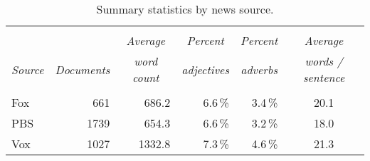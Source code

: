 \begin{table}[H]
    \caption{Summary statistics by news source. }
    \label{tab:summary}
    \centering
    \begin{tabular}{l|r|r|r|r|c} \hline \hline
             &                                &                                 &                                       &                                        &                                            \\
             &                                & \multicolumn{1}{c|}{\textit{Average}}        &   \multicolumn{1}{c|}{\textit{Percent}}            &  \multicolumn{1}{c|}{\textit{Percent}}      & \multicolumn{1}{c}{\textit{Average}}             \\
    \textit{Source}   & \multicolumn{1}{c|}{\textit{Documents}} & \multicolumn{1}{c|}{\textit{word count}} & \multicolumn{1}{c|}{\textit{adjectives}}   & \multicolumn{1}{c|}{\textit{adverbs}}       & \multicolumn{1}{c}{\textit{words / sentence}}          \\ \hline 
             &                                &                                 &                                       &                                        &                                            \\
    Fox      & 661                            & 686.2                           & 6.6\,\%                               & 3.4\,\%                                & 20.1                                       \\
    PBS      & 1739                           & 654.3                           & 6.6\,\%                               & 3.2\,\%                                & 18.0                                       \\
    Vox      & 1027                           & 1332.8                          & 7.3\,\%                               & 4.6\,\%                                & 21.3                                       \\ \hline  
    \end{tabular}
\end{table}